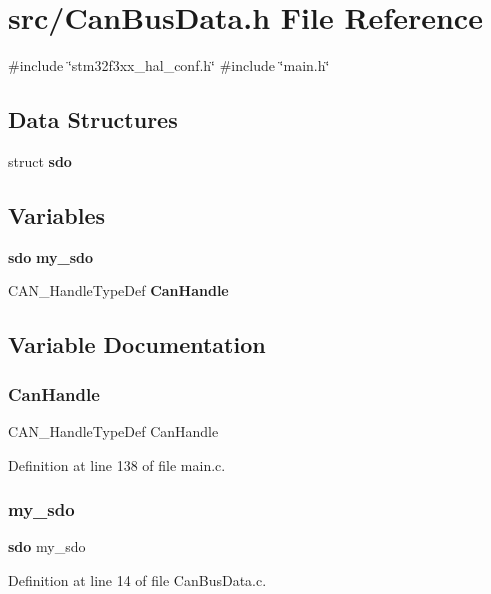 \section{src/\+Can\+Bus\+Data.h File Reference}
\label{_can_bus_data_8h}
{\ttfamily \#include \char`\"{}stm32f3xx\+\_\+hal\+\_\+conf.\+h\char`\"{}}\newline
{\ttfamily \#include \char`\"{}main.\+h\char`\"{}}\newline
\subsection*{Data Structures}
\begin{DoxyCompactItemize}
\item 
struct \textbf{ sdo}
\end{DoxyCompactItemize}
\subsection*{Variables}
\begin{DoxyCompactItemize}
\item 
\textbf{ sdo} \textbf{ my\+\_\+sdo}
\item 
C\+A\+N\+\_\+\+Handle\+Type\+Def \textbf{ Can\+Handle}
\end{DoxyCompactItemize}


\subsection{Variable Documentation}
\mbox{\label{_can_bus_data_8h_a71836aa79f107e6d2c027d4161658c88}} 
\subsubsection{Can\+Handle}
{\footnotesize\ttfamily C\+A\+N\+\_\+\+Handle\+Type\+Def Can\+Handle}



Definition at line 138 of file main.\+c.

\mbox{\label{_can_bus_data_8h_abfd0b99158871d264bb097f93a01bc85}} 
\subsubsection{my\+\_\+sdo}
{\footnotesize\ttfamily \textbf{ sdo} my\+\_\+sdo}



Definition at line 14 of file Can\+Bus\+Data.\+c.


